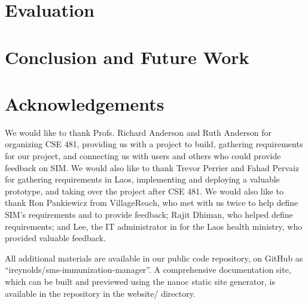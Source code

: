 \documentclass{acm_proc_article-sp}
\begin{document}
\section{Evaluation}

\section{Conclusion and Future Work}

\section{Acknowledgements}

We would like to thank Profs. Richard Anderson and Ruth Anderson for organizing CSE 481, providing us with a project to build, gathering requirements for our project, and connecting us with users and others who could provide feedback on SIM. We would also like to thank Trevor Perrier and Fahad Pervaiz for gathering requirements in Laos, implementing and deploying a valuable prototype, and taking over the project after CSE 481. We would also like to thank Ron Pankiewicz from VillageReach, who met with us twice to help define SIM's requirements and to provide feedback; Rajit Dhiman, who helped define requirements; and Lee, the IT administrator in for the Laos health ministry, who provided valuable feedback.


  
\balancecolumns

\appendix
All additional materials are available in our public code repository, on GitHub as ``ireynolds/sms-immunization-manager''. A comprehensive documentation site, which can be built and previewed using the nanoc static site generator, is available in the repository in the website/ directory.
\end{document}
